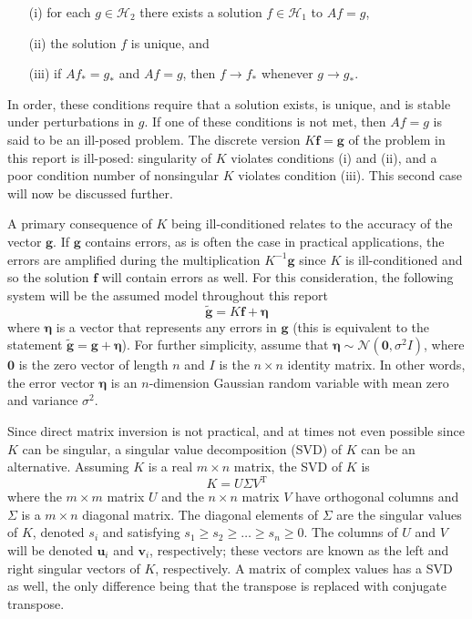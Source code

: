 \documentclass[12pt]{article}
\newcommand{\gdis}{\mathbf{g}}
\newcommand{\gnoise}{\widetilde{\mathbf{g}}}
\newcommand{\kmat}{K}	%
\newcommand{\fdis}{\mathbf{f}}
\newcommand{\trans}{\mathrm{T}}	%
\newcommand{\noiseSD}{\sigma}	%
\newcommand{\noise}{\bm{\eta}}	%
\newcommand{\singular}{s}	%
\newcommand{\LSV}{\mathbf{u}}	%
\newcommand{\RSV}{\mathbf{v}}	%
\begin{document}
\begin{enumerate}
\item[(i)] for each $g \in \mathcal{H}_2$ there exists a solution $f \in \mathcal{H}_1$ to $Af = g$,
\item[(ii)] the solution $f$ is unique, and
\item[(iii)] if $Af_* = g_*$ and $Af = g$, then $f \rightarrow f_*$ whenever $g \rightarrow g_*$.
\end{enumerate}
In order, these conditions require that a solution exists, is unique, and is stable under perturbations in $g$. If one of these conditions is not met, then $Af = g$ is said to be an ill-posed problem. The discrete version $\kmat\fdis = \gdis$ of the problem in this report is ill-posed: singularity of $\kmat$ violates conditions (i) and (ii), and a poor condition number of nonsingular $\kmat$ violates condition (iii). This second case will now be discussed further.  \par 
A primary consequence of $\kmat$ being ill-conditioned relates to the accuracy of the vector $\gdis$. If $\gdis$ contains errors, as is often the case in practical applications, the errors are amplified during the multiplication $\kmat^{-1}\gdis$ since $\kmat$ is ill-conditioned and so the solution $\fdis$ will contain errors as well. For this consideration, the following system will be the assumed model throughout this report
\begin{equation}
\gnoise = \kmat\fdis + \noise
\label{eq:DisNoise}
\end{equation}
where $\noise$ is a vector that represents any errors in $\gdis$ (this is equivalent to the statement $\gnoise = \gdis + \noise$). For further simplicity, assume that $\noise \sim \mathcal{N}(\bm{0},\noiseSD^2I)$, where $\bm{0}$ is the zero vector of length $n$ and $I$ is the $n \times n$ identity matrix. In other words, the error vector $\noise$ is an $n$-dimension Gaussian random variable with mean zero and variance $\noiseSD^2$. \par
Since direct matrix inversion is not practical, and at times not even possible since $\kmat$ can be singular, a singular value decomposition (SVD) of $\kmat$ can be an alternative. Assuming $\kmat$ is a real $m \times n$ matrix, the SVD of $\kmat$ is
\begin{equation}
\kmat = U\Sigma{V^\trans}
\label{eq:SVD}
\end{equation}
where the $m \times m$ matrix $U$ and the $n \times n$ matrix $V$ have orthogonal columns and $\Sigma$ is a $m \times n$ diagonal matrix. The diagonal elements of $\Sigma$ are the singular values of $\kmat$, denoted $\singular_i$ and satisfying $\singular_1 \geq \singular_2 \geq \ldots \geq \singular_n \geq 0$. The columns of $U$ and $V$ will be denoted $\LSV_i$ and $\RSV_i$, respectively; these vectors are known as the left and right singular vectors of $\kmat$, respectively. A matrix of complex values has a SVD as well, the only difference being that the transpose is replaced with conjugate transpose. \par
\end{document}
